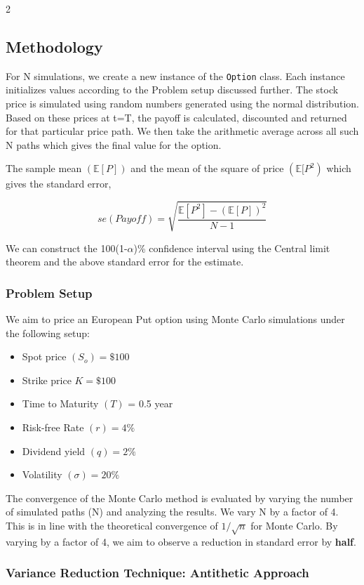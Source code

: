 \begin{multicols}{2}
\subsection{Methodology}

For N simulations, we create a new instance of the \texttt{Option} class. Each instance initializes values according to the Problem setup discussed further. The stock price is simulated using random numbers generated using the normal distribution. Based on these prices at t=T, the payoff is calculated, discounted and returned for that particular price path. We then take the arithmetic average across all such N paths which gives the final value for the option.

The sample mean $(\mathbb{E}[P])$ and the mean of the square of price $(\mathbb{E}[{P^2})$ which gives the standard error,

$$
    se(Payoff) = \sqrt{\frac{\mathbb{E}[{P^2}] - (\mathbb{E}[P])^2}{N - 1}}
$$

We can construct the 100(1-$\alpha$)\% confidence interval using the Central limit theorem and the above standard error for the estimate.

\subsubsection{Problem Setup}

We aim to price an European Put option using Monte Carlo simulations under the following setup:

\begin{itemize}
    \item Spot price $(S_o) = \$100$
    \item Strike price $K = \$100 $
    \item Time to Maturity $(T)$ = 0.5 year
    \item Risk-free Rate $(r) = 4\%$
    \item Dividend yield $(q) = 2\%$
    \item Volatility $(\sigma) = 20\%$
\end{itemize}

The convergence of the Monte Carlo method is evaluated by varying the number of simulated paths (N) and analyzing the results. We vary N by a factor of 4. This is in line with the theoretical convergence of $1/\sqrt{n}$ for Monte Carlo. By varying by a factor of 4, we aim to observe a reduction in standard error by \textbf{half}.

\subsubsection{Variance Reduction Technique: Antithetic Approach\cite{POUDEL}}


\end{multicols}
